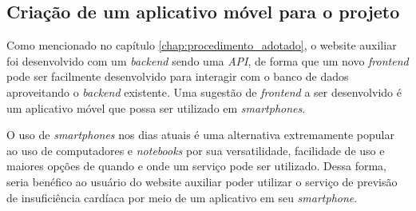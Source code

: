 \subsection{Criação de um aplicativo móvel para o projeto}

Como mencionado no capítulo \ref{chap:procedimento_adotado}, o website auxiliar foi desenvolvido com um \textit{backend} sendo uma \textit{API}, de forma que um novo \textit{frontend} pode ser facilmente desenvolvido para interagir com o banco de dados aproveitando o \textit{backend} existente. Uma sugestão de \textit{frontend} a ser desenvolvido é um aplicativo móvel que possa ser utilizado em \textit{smartphones}.

O uso de \textit{smartphones} nos dias atuais é uma alternativa extremamente popular ao uso de computadores e \textit{notebooks} por sua versatilidade, facilidade de uso e maiores opções de quando e onde um serviço pode ser utilizado. Dessa forma, seria benéfico ao usuário do website auxiliar poder utilizar o serviço de previsão de insuficiência cardíaca por meio de um aplicativo em seu \textit{smartphone}.
